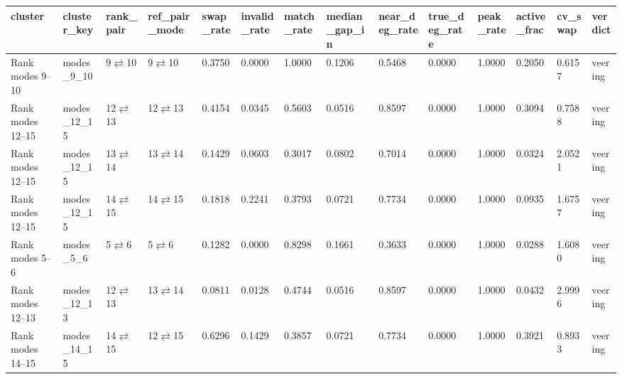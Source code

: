 \begin{tabular}{llllllllllllll}
\toprule
cluster & cluster\_key & rank\_pair & ref\_pair\_mode & swap\_rate & invalid\_rate & match\_rate & median\_gap\_in & near\_deg\_rate & true\_deg\_rate & peak\_rate & active\_frac & cv\_swap & verdict \\
\midrule
Rank modes 9--10 & modes\_9\_10 & 9$\rightleftarrows$10 & 9$\rightleftarrows$10 & 0.3750 & 0.0000 & 1.0000 & 0.1206 & 0.5468 & 0.0000 & 1.0000 & 0.2050 & 0.6157 & veering \\
Rank modes 12--15 & modes\_12\_15 & 12$\rightleftarrows$13 & 12$\rightleftarrows$13 & 0.4154 & 0.0345 & 0.5603 & 0.0516 & 0.8597 & 0.0000 & 1.0000 & 0.3094 & 0.7588 & veering \\
Rank modes 12--15 & modes\_12\_15 & 13$\rightleftarrows$14 & 13$\rightleftarrows$14 & 0.1429 & 0.0603 & 0.3017 & 0.0802 & 0.7014 & 0.0000 & 1.0000 & 0.0324 & 2.0521 & veering \\
Rank modes 12--15 & modes\_12\_15 & 14$\rightleftarrows$15 & 14$\rightleftarrows$15 & 0.1818 & 0.2241 & 0.3793 & 0.0721 & 0.7734 & 0.0000 & 1.0000 & 0.0935 & 1.6757 & veering \\
Rank modes 5--6 & modes\_5\_6 & 5$\rightleftarrows$6 & 5$\rightleftarrows$6 & 0.1282 & 0.0000 & 0.8298 & 0.1661 & 0.3633 & 0.0000 & 1.0000 & 0.0288 & 1.6080 & veering \\
Rank modes 12--13 & modes\_12\_13 & 12$\rightleftarrows$13 & 13$\rightleftarrows$14 & 0.0811 & 0.0128 & 0.4744 & 0.0516 & 0.8597 & 0.0000 & 1.0000 & 0.0432 & 2.9996 & veering \\
Rank modes 14--15 & modes\_14\_15 & 14$\rightleftarrows$15 & 12$\rightleftarrows$15 & 0.6296 & 0.1429 & 0.3857 & 0.0721 & 0.7734 & 0.0000 & 1.0000 & 0.3921 & 0.8933 & veering \\
\bottomrule
\end{tabular}
